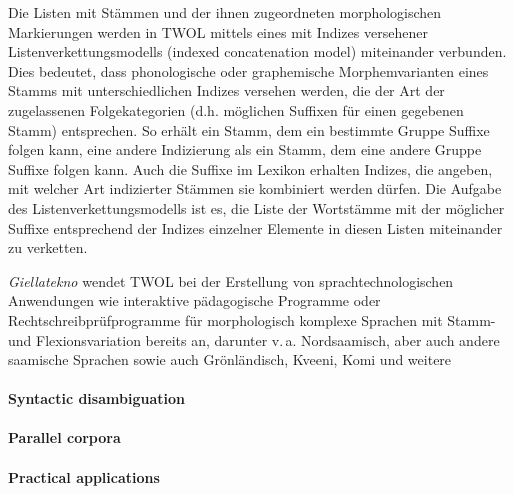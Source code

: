 \documentclass[a4paper,12pt]{article}
\begin{document}
Die Listen mit Stämmen und der ihnen zugeordneten morphologischen Markierungen werden in TWOL mittels eines mit Indizes versehener Listenverkettungsmodells (indexed concatenation model) miteinander verbunden. Dies bedeutet, dass phonologische oder graphemische Morphemvarianten eines Stamms mit unterschiedlichen Indizes versehen werden, die der Art der zugelassenen Folgekategorien (d.h. möglichen Suffixen für einen gegebenen Stamm) entsprechen. So erhält ein Stamm, dem ein bestimmte Gruppe Suffixe folgen kann, eine andere Indizierung als ein Stamm, dem eine andere Gruppe Suffixe folgen kann. Auch die Suffixe im Lexikon erhalten Indizes, die angeben, mit welcher Art indizierter Stämmen sie kombiniert werden dürfen. Die Aufgabe des Listenverkettungsmodells ist es, die Liste der Wortstämme mit der möglicher Suffixe entsprechend der Indizes einzelner Elemente in diesen Listen miteinander zu verketten.

\textit{Giellatekno} wendet TWOL bei der Erstellung von sprachtechnologischen Anwendungen wie interaktive pädagogische Programme oder Rechtschreibprüfprogramme für morphologisch komplexe Sprachen mit Stamm- und Flexionsvariation bereits an, darunter v.\,a. Nordsaamisch, aber auch andere saamische Sprachen sowie auch Grönländisch, Kveeni, Komi und weitere

\paragraph{Syntactic disambiguation}

\paragraph{Parallel corpora}

\paragraph{Practical applications}

\end{document}
